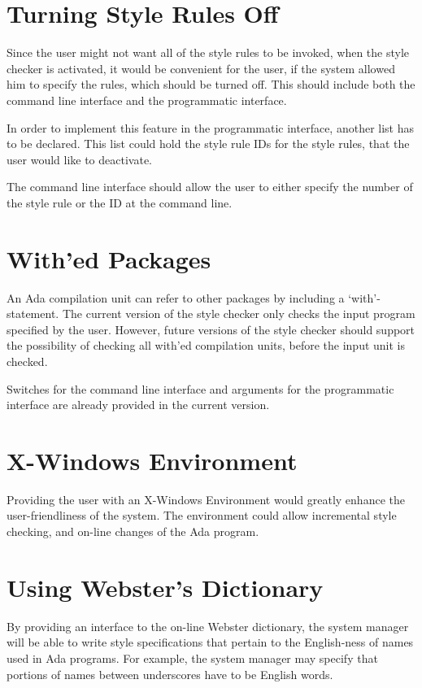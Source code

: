 \section{Turning Style Rules Off}
Since the user might not want all of the style rules to be invoked, when
the style checker is activated, it would be convenient for the user, if
the system allowed him to specify the rules, which should be turned
off. This should include both the command line interface and the 
programmatic interface. 

In order to implement this feature in the programmatic interface, another
list has to be declared. This list could hold the style rule IDs for the 
style rules, that the user would like to deactivate. 

The command line interface should allow the user to either specify
the number of the style rule or the ID at the command line.

\section{With'ed Packages}
An Ada compilation unit can refer to other packages by including a
`with'-statement. The current version of the style checker only
checks the input program specified by the user. However, future versions
of the style checker should support the possibility of checking all
with'ed compilation units, before the input unit is checked.

Switches for the command line interface and arguments for the programmatic
interface are already provided in the current version.

\section{X-Windows Environment}
Providing the user with an X-Windows Environment would greatly enhance
the user-friendliness of the system. The environment could allow
incremental style checking, and on-line changes of the Ada program.

\section{Using Webster's Dictionary}
By providing an interface to the on-line Webster dictionary, the system
manager will be able to write style specifications that pertain to the
English-ness of names used in Ada programs.  For example, the system
manager may specify that portions of names between underscores have to
be English words.
